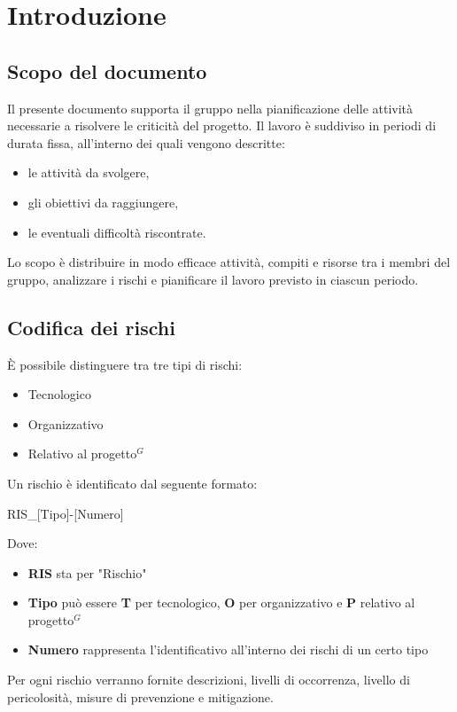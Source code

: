 \documentclass[a4paper,10pt]{article}
\begin{document}
\newpage

\tableofcontents

\newpage

\section{Introduzione}
\subsection{Scopo del documento}
Il presente documento supporta il gruppo nella pianificazione delle attività necessarie a risolvere le criticità del progetto. Il lavoro è suddiviso in periodi di durata fissa, all’interno dei quali vengono descritte:
\begin{itemize}
  \item le attività da svolgere,
  \item gli obiettivi da raggiungere,
  \item le eventuali difficoltà riscontrate.
\end{itemize}
Lo scopo è distribuire in modo efficace attività, compiti e risorse tra i membri del gruppo, analizzare i rischi e pianificare il lavoro previsto in ciascun periodo.

\subsection{Codifica dei rischi}
È possibile distinguere tra tre tipi di rischi: 
\begin{itemize}
  \item Tecnologico
  \item Organizzativo
  \item Relativo al progetto$^G$
\end{itemize}
Un rischio è identificato dal seguente formato:
\begin{center}
  RIS\_[Tipo]-[Numero]
\end{center}
Dove: 
\begin{itemize}
  \item \textbf{RIS} sta per "Rischio"
  \item \textbf{Tipo} può essere \textbf{T} per tecnologico, \textbf{O} per organizzativo e \textbf{P} relativo al progetto$^G$
  \item \textbf{Numero} rappresenta l'identificativo all'interno dei rischi di un certo tipo
\end{itemize}
Per ogni rischio verranno fornite descrizioni, livelli di occorrenza, livello di pericolosità, misure di prevenzione e mitigazione.
\end{document}
